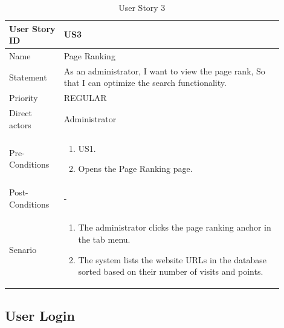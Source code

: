 \documentclass{scrartcl}
\begin{document}
\begin{table}[H]
  \caption{User Story 3}
  \begin{tabular}{p{0.18\linewidth} | p{0.72\linewidth}}
    \toprule
    User Story ID & US3
    \\\midrule
    Name & Page Ranking
    \\\hline
    Statement & As an administrator, I want to view the page rank, So that I can optimize the search functionality.
    \\\hline
    Priority & REGULAR
    \\\hline
    Direct actors & Administrator
    \\\hline
    Pre-Conditions & {
                     \begin{enumerate}
                     \item US1.
                     \item Opens the Page Ranking page.
                     \end{enumerate}
                     }\vspace*{-\baselineskip}
    \\\hline
    Post-Conditions & -
    \\\hline
    Senario & {
              \begin{enumerate}
              \item The administrator clicks the page ranking anchor in the tab menu.
              \item The system lists the website URLs in the database sorted based on their number of visits and points.
              \end{enumerate}
              }\vspace*{-\baselineskip}
    \\\bottomrule
  \end{tabular}
\end{table}

\subsection{User Login}
\end{document}
